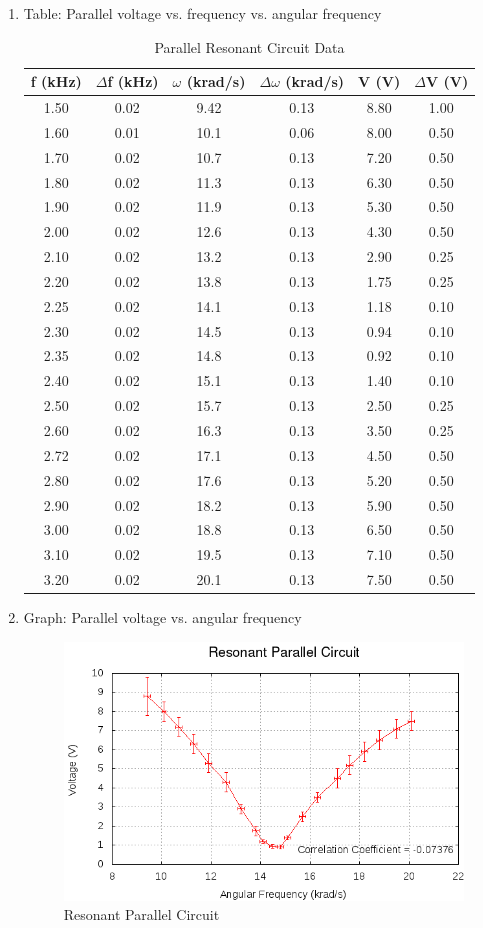 \documentclass[justified]{tufte-book}
\begin{document}
\begin{enumerate}[resume]
\newpage
\item Table: Parallel voltage vs. frequency vs. angular frequency
\begin{table}[H]
\center
\begin{tabular}{|c|c|c|c|c|c|}
\hline
f (kHz) & $\Delta$f (kHz) & $\omega$ (krad/s) & $\Delta\omega$ (krad/s) & V (V) & $\Delta$V (V)\\
\hline
1.50&0.02&9.42&0.13&8.80&1.00\\
1.60&0.01&10.1&0.06&8.00&0.50\\
1.70&0.02&10.7&0.13&7.20&0.50\\
1.80&0.02&11.3&0.13&6.30&0.50\\
1.90&0.02&11.9&0.13&5.30&0.50\\
2.00&0.02&12.6&0.13&4.30&0.50\\
2.10&0.02&13.2&0.13&2.90&0.25\\
2.20&0.02&13.8&0.13&1.75&0.25\\
2.25&0.02&14.1&0.13&1.18&0.10\\
2.30&0.02&14.5&0.13&0.94&0.10\\
2.35&0.02&14.8&0.13&0.92&0.10\\
2.40&0.02&15.1&0.13&1.40&0.10\\
2.50&0.02&15.7&0.13&2.50&0.25\\
2.60&0.02&16.3&0.13&3.50&0.25\\
2.72&0.02&17.1&0.13&4.50&0.50\\
2.80&0.02&17.6&0.13&5.20&0.50\\
2.90&0.02&18.2&0.13&5.90&0.50\\
3.00&0.02&18.8&0.13&6.50&0.50\\
3.10&0.02&19.5&0.13&7.10&0.50\\
3.20&0.02&20.1&0.13&7.50&0.50\\
\hline
\end{tabular}
\label{tbl:RLCParallel}
\caption{Parallel Resonant Circuit Data}
\end{table}
\item Graph: Parallel voltage vs. angular frequency
  \begin{figure}[h!]
    \includegraphics{RLC-Resonant-Circuits-Parallel-Graph.png}
    \caption{Resonant Parallel Circuit}
    \label{pic:RLCParallel}
  \end{figure}
\end{enumerate}
\end{document}
